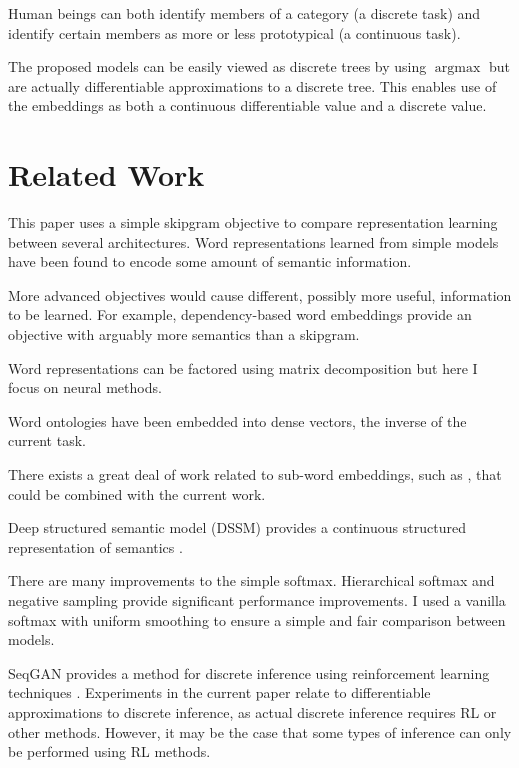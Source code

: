 \documentclass[sigconf]{acmart}
\begin{document}
Human beings can both identify members of a category (a discrete task) and identify certain members as more or less prototypical (a continuous task).

The proposed models can be easily viewed as discrete trees by using $\operatorname{argmax}$ but are actually differentiable approximations to a discrete tree. This enables use of the embeddings as both a continuous differentiable value and a discrete value.

\section{Related Work}

This paper uses a simple skipgram objective to compare representation learning between several architectures. Word representations learned from simple models have been found to encode some amount of semantic information. \cite{DBLP:journals/corr/MikolovSCCD13} \cite{DBLP:journals/corr/abs-1301-3781}

More advanced objectives would cause different, possibly more useful, information to be learned. For example, dependency-based word embeddings provide an objective with arguably more semantics than a skipgram. \cite{Levy2014}

Word representations can be factored using matrix decomposition but here I focus on neural methods. \cite{pennington2014glove}

Word ontologies have been embedded into dense vectors, the inverse of the current task. \cite{Bordes:2011:LSE:2900423.2900470}

There exists a great deal of work related to sub-word embeddings, such as \cite{Li2015}, that could be combined with the current work.

Deep structured semantic model (DSSM) provides a continuous structured representation of semantics \cite{unsupervised-learning-of-word-semantic-embedding-using-the-deep-structured-semantic-model}. 

There are many improvements to the simple softmax. Hierarchical softmax \cite{Morin05hierarchicalprobabilistic} and negative sampling provide significant performance improvements. I used a vanilla softmax with uniform smoothing to ensure a simple and fair comparison between models.

SeqGAN provides a method for discrete inference using reinforcement learning techniques \cite{DBLP:journals/corr/YuZWY16}. Experiments in the current paper relate to differentiable approximations to discrete inference, as actual discrete inference requires RL or other methods. However, it may be the case that some types of inference can only be performed using RL methods.
\end{document}
